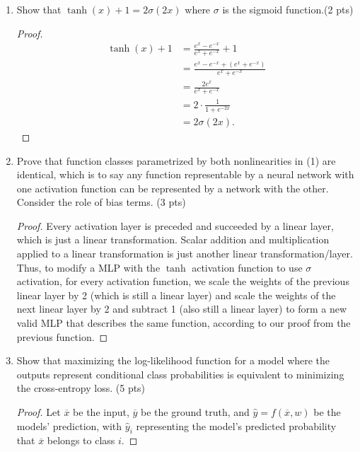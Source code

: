 \begin{solution*}{}

\begin{enumerate}
\item Show that $\tanh(x) + 1 = 2 \sigma (2x)$ where $\sigma$ is the sigmoid
    function.\hfill (2 pts)

\begin{proof}
\begin{align*}
    \tanh(x) + 1 &= \frac{e^{x} - e^{-x}}{e^{x} + e^{-x}} + 1 \\ 
    &= \frac{e^{x} - e^{-x} + (e^{x} + e^{-x})}{e^{x} + e^{-x}} \\ 
    &= \frac{2e^{x}}{e^{x} + e^{-x}} \\ 
    &= 2 \cdot \frac{1}{1 + e^{-2x}} \\ 
    &= 2\sigma(2x)
.\end{align*}
\end{proof}

\item Prove that function classes parametrized by both nonlinearities in (1) are
    identical, which is to say any function representable by a neural network
    with one activation function can be represented by a network with the other.
    Consider the role of bias terms. \hfill (3 pts)

\begin{proof}
Every activation layer is preceded and succeeded by a linear layer, which is 
just a linear transformation. Scalar addition and multiplication applied to a 
linear transformation is just another linear transformation/layer. Thus, to modify 
a MLP with the $\tanh$ activation function to use $\sigma$ activation, for every 
activation function, we scale the weights of the previous linear layer by 2 (which 
is still a linear layer) and scale the weights of the next linear layer by 2 and
subtract 1 (also still a linear layer) to form a new valid MLP that describes
the same function, according to our proof from the previous function.
\end{proof}

\item Show that maximizing the log-likelihood function for a model where the
    outputs represent conditional class probabilities is equivalent to
    minimizing the cross-entropy loss. \hfill (5 pts)

\begin{proof}
Let $\overline{x}$ be the input, $\overline{y}$ be the ground truth, and
$\hat{y}=f(\overline{x}, w)$ be the models' prediction, with $\hat{y}_{i}$
representing the model's predicted probability that $\overline{x}$ belongs to
class $i$. 


\end{proof}
\end{enumerate}
\end{solution*}

